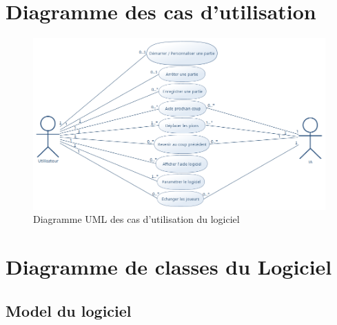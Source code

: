 \documentclass[a4paper,12pt]{report}
\begin{document}
\section{Diagramme des cas d'utilisation}
\label{B}
\begin{figure}[H]
\centering
  \includegraphics[scale=0.65]{Besoins/Othello_Uses_Cases.png}
\caption{Diagramme UML des cas d'utilisation du logiciel}
\end{figure}

\section{Diagramme de classes du Logiciel}
\label{OthKer}
\subsection{Model du logiciel}
\end{document}
